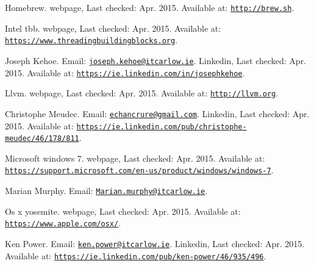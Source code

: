 \begin{DoxyDescription}
\item[\label{_CITEREF_homebrew}%
\mbox{[}8\mbox{]}]Homebrew. webpage, Last checked\+: Apr. 2015. Available at\+: \href{http://brew.sh}{\tt http\+://brew.\+sh}.


\item[\label{_CITEREF_inteltbb}%
\mbox{[}9\mbox{]}]Intel tbb. webpage, Last checked\+: Apr. 2015. Available at\+: \href{https://www.threadingbuildingblocks.org}{\tt https\+://www.\+threadingbuildingblocks.\+org}.


\item[\label{_CITEREF_josephkehoe}%
\mbox{[}10\mbox{]}]Joseph Kehoe. Email\+: \href{mailto:joseph.kehoe@itcarlow.ie}{\tt joseph.\+kehoe@itcarlow.\+ie}. Linkedin, Last checked\+: Apr. 2015. Available at\+: \href{https://ie.linkedin.com/in/josephkehoe}{\tt https\+://ie.\+linkedin.\+com/in/josephkehoe}.


\item[\label{_CITEREF_llvm}%
\mbox{[}11\mbox{]}]Llvm. webpage, Last checked\+: Apr. 2015. Available at\+: \href{http://llvm.org}{\tt http\+://llvm.\+org}.


\item[\label{_CITEREF_christophemeudec}%
\mbox{[}12\mbox{]}]Christophe Meudec. Email\+: \href{mailto:echancrure@gmail.com}{\tt echancrure@gmail.\+com}. Linkedin, Last checked\+: Apr. 2015. Available at\+: \href{https://ie.linkedin.com/pub/christophe-meudec/46/178/811}{\tt https\+://ie.\+linkedin.\+com/pub/christophe-\/meudec/46/178/811}.


\item[\label{_CITEREF_microsoftwindows7}%
\mbox{[}13\mbox{]}]Microsoft windows 7. webpage, Last checked\+: Apr. 2015. Available at\+: \href{https://support.microsoft.com/en-us/product/windows/windows-7}{\tt https\+://support.\+microsoft.\+com/en-\/us/product/windows/windows-\/7}.


\item[\label{_CITEREF_marianmurphy}%
\mbox{[}14\mbox{]}]Marian Murphy. Email\+: \href{mailto:Marian.murphy@itcarlow.ie}{\tt Marian.\+murphy@itcarlow.\+ie}.


\item[\label{_CITEREF_osxyosemite}%
\mbox{[}15\mbox{]}]Os x yosemite. webpage, Last checked\+: Apr. 2015. Available at\+: \href{https://www.apple.com/osx/}{\tt https\+://www.\+apple.\+com/osx/}.


\item[\label{_CITEREF_kenpower}%
\mbox{[}16\mbox{]}]Ken Power. Email\+: \href{mailto:ken.power@itcarlow.ie}{\tt ken.\+power@itcarlow.\+ie}. Linkedin, Last checked\+: Apr. 2015. Available at\+: \href{https://ie.linkedin.com/pub/ken-power/46/935/496}{\tt https\+://ie.\+linkedin.\+com/pub/ken-\/power/46/935/496}.



\end{DoxyDescription}
